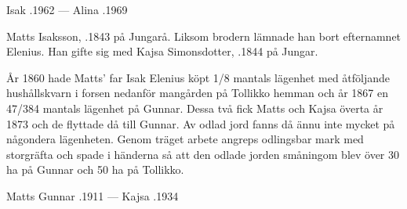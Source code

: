 Isak .1962  ---  Alina .1969


%
Matts Isaksson, .1843 på Jungarå. Liksom brodern lämnade han bort efternamnet Elenius. Han gifte sig med Kajsa Simonsdotter,	.1844 på Jungar.
\begin{jhchildren}
  \item {}
  \item {}
  \item {}
  \item {}
  \item {}
  \item {}
  \item {}
  \item {}
\end{jhchildren}

År 1860 hade Matts' far Isak Elenius köpt 1/8 mantals lägenhet med åtföljande hushållskvarn i forsen nedanför mangården på Tollikko hemman och år 1867 en 47/384 mantals lägenhet på Gunnar. Dessa två fick Matts och Kajsa överta år 1873 och de flyttade då till Gunnar. Av odlad jord fanns då ännu inte mycket på någondera lägenheten. Genom träget arbete angreps odlingsbar mark med storgräfta och spade i händerna så att den odlade jorden småningom blev över 30 ha på Gunnar och 50 ha på Tollikko.

Matts Gunnar .1911  ---  Kajsa .1934



